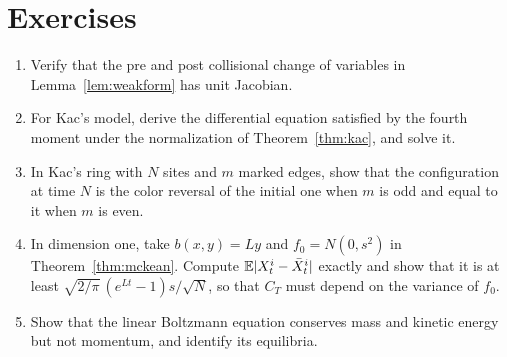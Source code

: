 \section*{Exercises}
\begin{enumerate}
\item Verify that the pre and post collisional change of variables in Lemma~\ref{lem:weakform} has unit Jacobian.
\item For Kac's model, derive the differential equation satisfied by the fourth moment under the normalization of Theorem~\ref{thm:kac}, and solve it.
\item In Kac's ring with $N$ sites and $m$ marked edges, show that the configuration at time $N$ is the color reversal of the initial one when $m$ is odd and equal to it when $m$ is even.
\item In dimension one, take $b(x,y) = Ly$ and $f_0 = N(0,s^2)$ in Theorem~\ref{thm:mckean}. Compute $\mathbb{E}|X^i_t-\bar X^i_t|$ exactly and show that it is at least $\sqrt{2/\pi}\,(e^{Lt}-1)s/\sqrt N$, so that $C_T$ must depend on the variance of $f_0$.
\item Show that the linear Boltzmann equation conserves mass and kinetic energy but not momentum, and identify its equilibria.
\end{enumerate}
